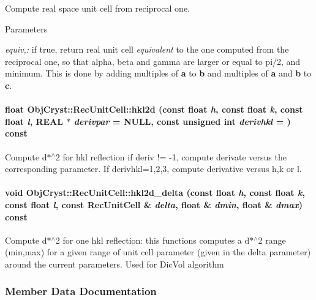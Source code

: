 Compute real space unit cell from reciprocal one. 
\begin{DoxyParams}{Parameters}
\item[{\em equiv,:}]if true, return real unit cell {\itshape equivalent\/} to the one computed from the reciprocal one, so that alpha, beta and gamma are larger or equal to pi/2, and minimum. This is done by adding multiples of {\bfseries a} to {\bfseries b} and multiples of {\bfseries a} and {\bfseries b} to {\bfseries c}. \end{DoxyParams}
\paragraph[{hkl2d}]{\setlength{\rightskip}{0pt plus 5cm}float ObjCryst::RecUnitCell::hkl2d (const float {\em h}, \/  const float {\em k}, \/  const float {\em l}, \/  REAL $\ast$ {\em derivpar} = {\ttfamily NULL}, \/  const unsigned int {\em derivhkl} = {}) const}\hfill\label{a00069_ac71ccf881e231fa1853ba628b48ce915}


Compute d$\ast$$^\wedge$2 for hkl reflection if deriv != -\/1, compute derivate versus the corresponding parameter. If derivhkl=1,2,3, compute derivative versus h,k or l. 
\paragraph[{hkl2d\_\-delta}]{\setlength{\rightskip}{0pt plus 5cm}void ObjCryst::RecUnitCell::hkl2d\_\-delta (const float {\em h}, \/  const float {\em k}, \/  const float {\em l}, \/  const {\bf RecUnitCell} \& {\em delta}, \/  float \& {\em dmin}, \/  float \& {\em dmax}) const}\hfill\label{a00069_a29ed2d05b37b3a9344e8d95d3344651e}


Compute d$\ast$$^\wedge$2 for one hkl reflection: this functions computes a d$\ast$$^\wedge$2 range (min,max) for a given range of unit cell parameter (given in the delta parameter) around the current parameters. Used for DicVol algorithm 

\subsubsection{Member Data Documentation}
